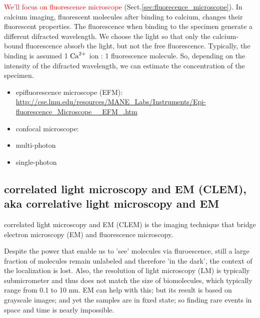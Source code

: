 \textcolor{red}{We'll focus on fluorescence microscope}
(Sect.\ref{sec:fluorecence_microscope}). In calcium imaging, fluorescent
molecules after binding to calcium, changes their fluorescent properties. The
fluorescence when binding to the specimen generate a different difracted
wavelength. We choose the light so that only the calcium-bound fluorescence
absorb the light, but not the free fluorescence. Typically, the binding is
assumed 1 ${\text{Ca}^{2+}}$ ion : 1 fluorescence molecule. So, depending on the intensity of
the difracted wavelength, we can estimate the concentration of the specimen.
    
  \begin{itemize}
    \item epifluorescence microscope (EFM):
    \url{http://cse.lmu.edu/resources/MANE_Labs/Instruments/Epi-fluorescence_Microscope__EFM_.htm}
    \item confocal microscope:
    \item multi-photon
    \item single-photon
  \end{itemize}




\subsection{correlated light microscopy and EM (CLEM), aka correlative light
microscopy and EM}
\label{sec:correlative-microscopy}

correlated light microscopy and EM (CLEM) is the imaging technique that bridge
electron microscopy (EM) and fluorescence microscopy.

Despite the power that enable us to 'see' molecules via fluroescence, still a
large fraction of molecules remain unlabeled and therefore 'in the dark', the
context of the localization is lost.
Also, the resolution of light microscopy (LM) is typically submicrometer and
thus does not match the size of biomolecules, which typically range from 0.1 to
10 nm. EM can help with this; but its result is based on grayscale images; and
yet the samples are in fixed state; so  finding rare events in space and time is
nearly impossible.

